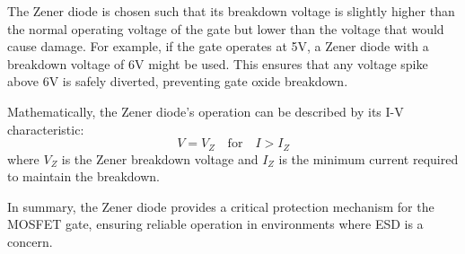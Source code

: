 The Zener diode is chosen such that its breakdown voltage is slightly higher than the normal operating voltage of the gate but lower than the voltage that would cause damage. For example, if the gate operates at 5V, a Zener diode with a breakdown voltage of 6V might be used. This ensures that any voltage spike above 6V is safely diverted, preventing gate oxide breakdown.

Mathematically, the Zener diode's operation can be described by its I-V characteristic:
\[
V = V_Z \quad \text{for} \quad I > I_Z
\]
where \( V_Z \) is the Zener breakdown voltage and \( I_Z \) is the minimum current required to maintain the breakdown.

In summary, the Zener diode provides a critical protection mechanism for the MOSFET gate, ensuring reliable operation in environments where ESD is a concern.


